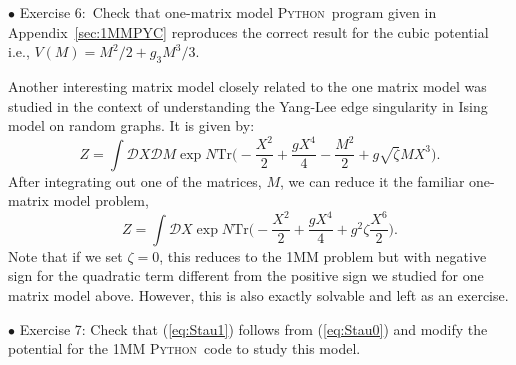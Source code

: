\documentclass[letter,11pt]{article}
\newcommand{\PY}{\textsc{Python}}
\begin{document}
\begin{mdframed}[backgroundcolor=blue!3] 
	$\bullet$ Exercise 6:~Check that one-matrix model \PY~program given in Appendix~\ref{sec:1MMPYC} reproduces the correct result for the cubic potential 
	i.e., $V(M) = M^2/2 + g_{3}M^3/3$.  
	\label{ex:6} 
\end{mdframed} 
Another interesting matrix model closely related to the one matrix model was 
studied in the context of understanding the Yang-Lee edge singularity
\cite{Staudacher:1989fy} in Ising model on random graphs. 
It is given by: 
\begin{equation}
	\label{eq:Stau0}
	Z = \int \mathcal{D}X \mathcal{D}M \exp N \mbox{Tr}\Bigg(-\frac{X^2}{2} + \frac{gX^4}{4} - \frac{M^2}{2} + g \sqrt{\zeta} MX^3 \Bigg).
\end{equation}
After integrating out one of the matrices, $M$, we can reduce it the familiar one-matrix model problem, 
\begin{equation}
	\label{eq:Stau1} 
	Z = \int \mathcal{D}X \exp N \mbox{Tr}\Bigg(-\frac{X^2}{2} + \frac{gX^4}{4} + g^2 \zeta  \frac{X^6}{2}   \Bigg).
\end{equation}
Note that if we set $\zeta=0$, this reduces to the 1MM problem but with negative sign for the quadratic term different from the positive sign we studied for one matrix model above. However, this is also exactly solvable and left as an exercise. 
\begin{mdframed}[backgroundcolor=blue!3]  
	$\bullet$ Exercise 7: Check that (\ref{eq:Stau1}) follows from (\ref{eq:Stau0}) and modify the potential for the 1MM \PY~code to study this model. 
\end{mdframed} 
\end{document}
